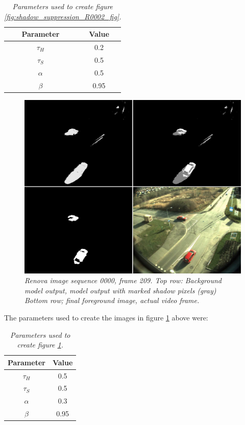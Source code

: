 \begin{table}[htb]
\centering
\begin{tabular}{|c|c|}
	\hline
	Parameter & Value  \\
	\hline
	$\tau_H$ &  0.2 \\
	\hline
	$\tau_S$ & 0.5 \\
	\hline
	$\alpha$ &  0.5 \\
	\hline
	$\beta$ &  0.95 \\
	\hline
\end{tabular}

\caption{\textit{Parameters used to create figure \ref{fig:shadow_suppression_R0002_fig}.}}
\label{tab:shadow_parameters_R0002_fig}
\end{table}


\newpage
\begin{figure}[htb]
	\centering
	\includegraphics[width=\linewidth]{images/ShadowRenova0000.png}
	\caption{\textit{Renova image sequence 0000, frame 209. 
	\newline
	Top row: Background model output, model output with marked shadow pixels (gray) \newline
	Bottom row; final foreground image, actual video frame.}}
	\label{fig:shadow_suppression_R0000_fig}  %
\end{figure}

The parameters used to create the images in figure \ref{fig:shadow_suppression_R0000_fig} above were:

\begin{table}[htb]
\centering
\begin{tabular}{|c|c|}
	\hline
	Parameter & Value  \\
	\hline
	$\tau_H$ &  0.5 \\
	\hline
	$\tau_S$ & 0.5 \\
	\hline
	$\alpha$ &  0.3 \\
	\hline
	$\beta$ &  0.95 \\
	\hline
\end{tabular}

\caption{\textit{Parameters used to create figure \ref{fig:shadow_suppression_R0000_fig}.}}
\label{tab:shadow_parameters_R0000}
\end{table}
